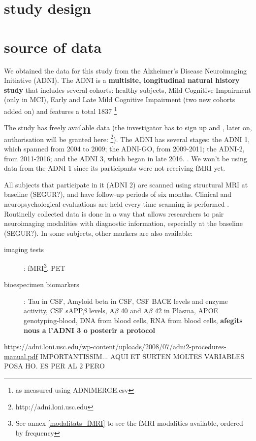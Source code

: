 


\section{study design} %


\section{source of data} \label{sourceofdata} %
		
		We obtained the data for this study from the Alzheimer's Disease Neuroimaging Initiative (ADNI). The ADNI is a \textbf{multisite, longitudinal natural history study} that includes several cohorts: healthy subjects, Mild Cognitive Impairment (only in MCI), Early and Late Mild Cognitive Impairment (two new cohorts added on) and features a total 1837 \footnote{as measured using ADNIMERGE.csv}
		
		The study has freely available data (the investigator has to sign up and , later on, authorisation will be granted here: \footnote{http://adni.loni.usc.edu}). The ADNI has several stages: the ADNI 1, which spanned from 2004 to 2009; the ADNI-GO, from 2009-2011; the ADNI-2, from 2011-2016; and the ADNI 3, which began in late 2016. \cite{Protocol_ADNI3}. We won't be using data from the ADNI 1 since its participants were not receiving fMRI yet.
		
		All subjects that participate in it (ADNI 2) are scanned using structural MRI at baseline (SEGUR?), and have follow-up periods of six months\cite{adni2_protocol_extension}. Clinical and neuropsychological evaluations are held every time scanning is performed \cite{adni2_protocol_extension}. Routinelly collected data is done in a way that allows researchers to pair neuroimaging modalities with diagnostic information, especially at the baseline (SEGUR?). In some subjects, other markers are also available:

		
		\begin{description}
		 	\item [imaging tests]: fMRI\footnote{See annex \ref{modalitats_fMRI} to see the fMRI modalities available, ordered by frequency}, PET
		 	\item [bioespecimen biomarkers]: Tau in CSF, Amyloid beta in CSF, CSF BACE levels and enzyme activity, CSF sAPP$\beta$ levels, A$\beta$ 40 and A$\beta$ 42 in Plasma, APOE genotyping-blood, DNA from blood cells, RNA from blood cells, \textbf{afegits nous a l'ADNI 3 o posterir a protocol}
		\end{description}
			\url{https://adni.loni.usc.edu/wp-content/uploads/2008/07/adni2-procedures-manual.pdf} IMPORTANTISSIM... AQUI ET SURTEN MOLTES VARIABLES POSA HO. ES PER AL 2 PERO


